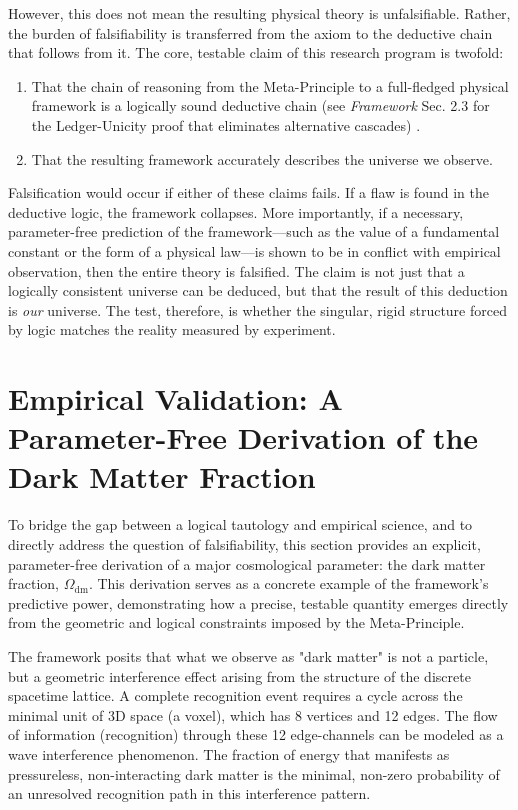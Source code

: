 \documentclass[axioms,article,submit,pdftex,oneauthor]{Definitions/mdpi}
\begin{document}
However, this does not mean the resulting physical theory is unfalsifiable. Rather, the burden of falsifiability is transferred from the axiom to the deductive chain that follows from it. The core, testable claim of this research program is twofold:
\begin{enumerate}
    \item That the chain of reasoning from the Meta-Principle to a full-fledged physical framework is a logically sound deductive chain (see \textit{Framework} Sec. 2.3 for the Ledger-Unicity proof that eliminates alternative cascades) \cite{washburn2025zenodo}.
    \item That the resulting framework accurately describes the universe we observe.
\end{enumerate}
Falsification would occur if either of these claims fails. If a flaw is found in the deductive logic, the framework collapses. More importantly, if a necessary, parameter-free prediction of the framework—such as the value of a fundamental constant or the form of a physical law—is shown to be in conflict with empirical observation, then the entire theory is falsified. The claim is not just that a logically consistent universe can be deduced, but that the result of this deduction is \textit{our} universe. The test, therefore, is whether the singular, rigid structure forced by logic matches the reality measured by experiment.

\section{Empirical Validation: A Parameter-Free Derivation of the Dark Matter Fraction}
To bridge the gap between a logical tautology and empirical science, and to directly address the question of falsifiability, this section provides an explicit, parameter-free derivation of a major cosmological parameter: the dark matter fraction, \(\Omega_{\text{dm}}\). This derivation serves as a concrete example of the framework's predictive power, demonstrating how a precise, testable quantity emerges directly from the geometric and logical constraints imposed by the Meta-Principle.

The framework posits that what we observe as "dark matter" is not a particle, but a geometric interference effect arising from the structure of the discrete spacetime lattice. A complete recognition event requires a cycle across the minimal unit of 3D space (a voxel), which has 8 vertices and 12 edges. The flow of information (recognition) through these 12 edge-channels can be modeled as a wave interference phenomenon. The fraction of energy that manifests as pressureless, non-interacting dark matter is the minimal, non-zero probability of an unresolved recognition path in this interference pattern.
\end{document}
